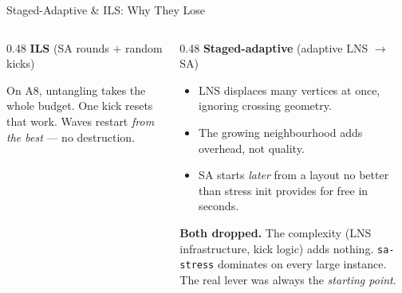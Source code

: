 \begin{frame}{Staged-Adaptive \& ILS: Why They Lose}
  \begin{columns}[T]
    \begin{column}{0.48\textwidth}
      \textbf{ILS} (SA rounds $+$ random kicks)
      \medskip

      \begin{center}
      \end{center}

      \smallskip
      On A8, untangling takes the whole budget.
      One kick resets that work.
      Waves restart \emph{from the best} --- no destruction.
    \end{column}
    \begin{column}{0.48\textwidth}
      \textbf{Staged-adaptive} (adaptive LNS $\to$ SA)
      \medskip
      \begin{itemize}
        \item LNS displaces many vertices at once, ignoring crossing geometry.
        \item The growing neighbourhood adds overhead, not quality.
        \item SA starts \emph{later} from a layout no better than stress init
              provides for free in seconds.
      \end{itemize}
      \vfill
      \textbf{Both dropped.}
      The complexity (LNS infrastructure, kick logic) adds nothing.
      \texttt{sa-stress} dominates on every large instance.
      The real lever was always the \emph{starting point}.
    \end{column}
  \end{columns}
\end{frame}

